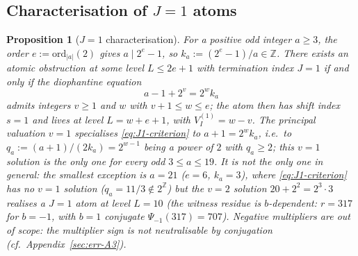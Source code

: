 \documentclass[11pt,reqno]{amsart}
\theoremstyle{plain}
\newtheorem{proposition}[theorem]{Proposition}
\theoremstyle{definition}
\theoremstyle{remark}
\newcommand{\Z}{\mathbb{Z}}
\newcommand{\Vi}{V_{I}}
\newcommand{\ord}{\mathrm{ord}}
\begin{document}
\subsection{Characterisation of \texorpdfstring{$J = 1$}{J=1} atoms}

\begin{proposition}[$J = 1$ characterisation]\label{prop:J1-character}
For a positive odd integer $a \ge 3$, the order $e := \ord_{\lvert a \rvert}(2)$ gives
$a \mid 2^e - 1$, so $k_a := (2^e - 1)/a \in \Z$. There exists an atomic
obstruction at some level $L \le 2e + 1$ with termination index $J = 1$ if
and only if the diophantine equation
\begin{equation}\label{eq:J1-criterion}
a - 1 + 2^{v} = 2^{w} k_a
\end{equation}
admits integers $v \ge 1$ and $w$ with $v + 1 \le w \le e$; the atom then
has shift index $s = 1$ and lives at level $L = w + e + 1$, with
$\Vi^{(1)} = w - v$. The principal valuation $v = 1$ specialises
\eqref{eq:J1-criterion} to $a + 1 = 2^{w} k_a$, i.e.\ to
$q_a := (a + 1)/(2 k_a) = 2^{w-1}$ being a power of $2$ with $q_a \ge 2$;
this $v = 1$ solution is the only one for every odd $3 \le a \le 19$. It is
\emph{not} the only one in general: the smallest exception is $a = 21$
($e = 6$, $k_a = 3$), where \eqref{eq:J1-criterion} has no $v = 1$ solution
($q_a = 11/3 \notin 2^{\Z}$) but the $v = 2$ solution $20 + 2^2 = 2^3 \cdot 3$
realises a $J = 1$ atom at level $L = 10$ (the witness residue is
$b$-dependent: $r = 317$ for $b = -1$, with $b = 1$ conjugate
$\Psi_{-1}(317) = 707$). Negative
multipliers are out of scope: the multiplier sign is not neutralisable by
conjugation (cf.\ Appendix~\ref{sec:err-A3}).
\end{proposition}
\end{document}
